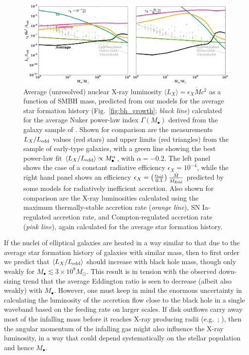 \documentclass[usenatbib,fleqn]{mn2e}
\newcommand{\Mdot}{\dot{M}}
\newcommand{\MdotEdd}{\dot{M}_{\rm Edd}}
\begin{document}
\begin{figure}
\includegraphics[width=\textwidth]{miller.pdf}
\caption{\label{fig:miller} Average (unresolved) nuclear X-ray luminosity $\langle L_X \rangle = \epsilon_X \Mdot c^2$ as a function of SMBH mass, predicted from our models for the average star formation history (Fig.~\ref{fig:bh_growth}; {\it black line}) calculated for the average Nuker power-law index $\Gamma(M_{\bullet})$ derived from the galaxy sample of \citet{LauerFaber+:2007a}.  Shown for comparison are the measurements $L_X/L_{\rm edd}$ values (red stars) and
  upper limits (red triangles) from the \citet{Miller+15} sample of early-type galaxies, with a green line showing the best power-law fit $\langle L_X/L_{\rm edd}\rangle \propto M_{\bullet}^{\alpha}$, with $\alpha = -0.2$.  The left panel shows the case of a constant radiative efficiency $\epsilon_X=10^{-4}$, while the right hand panel shows an efficiency $\epsilon_X=
  \left(\frac{\epsilon_{\rm bol}}{0.1}\right)\frac{\Mdot}{\MdotEdd}$ predicted by some models for radiatively inefficient accretion.  Also shown for comparison are the X-ray luminosities calculated using the maximum thermally-stable accretion rate ({\it orange line}), SN Ia-regulated accretion rate, and Compton-regulated accretion rate ({\it pink line}),  again calculated for the average star formation history.}
\end{figure}

If the nuclei of elliptical galaxies are heated in a way similar to that due to the average star formation history of galaxies with
similar mass, then to first order we predict that $\langle
L_{X}/L_{\rm edd}\rangle$ should increase with black hole mass, though
only weakly for $M_{\bullet} \lesssim 3\times 10^{8}M_{\odot}$.  This
result is in tension with the observed down-sizing trend that the
average Eddington ratio is seen to decrease (albeit also weakly)
with $M_{\bullet}$.  However, one must keep in mind the enormous uncertainty in calculating the
luminosity of the accretion flow close to the black hole in a single
waveband based on the feeding rate on larger scales.  If disk outflows carry away most of the infalling mass before it reaches X-ray producing radii (e.g.~\citealt{Blandford&Begelman99}; \citealt{Li+13}), then the
angular momentum of the infalling gas might also influence the X-ray luminosity, in a way
that could depend systematically on the stellar population and hence $M_{\bullet}$.
\end{document}
